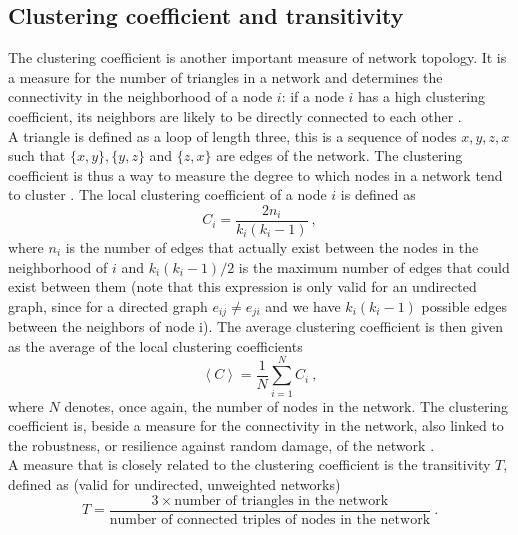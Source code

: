 \documentclass[11 pt , letterpaper , twoside , openright]{book}
\begin{document}
\subsection{Clustering coefficient and transitivity}

The clustering coefficient is another important measure of network topology. It is a measure for the number of triangles in a network and determines the connectivity in the neighborhood of a node $i$: if a node $i$ has a high clustering coefficient, its neighbors are likely to be directly connected to each other \cite{Li2017}. \\
\newline
A triangle is defined as a loop of length three, this is a sequence of nodes $x, y, z, x$ such that $\{x, y\}, \{y, z\}$ and $\{z, x\}$ are edges of the network. The clustering coefficient is thus a way to measure the degree to which nodes in a network tend to cluster \cite{Li2017}. The local clustering coefficient of a node $i$ is defined as \cite{Mata2020}
\begin{equation}\label{clus}
	C_i = \frac{2n_i}{k_i(k_i-1)} \ ,
\end{equation}
where $n_i$ is the number of edges that actually exist between the nodes in the neighborhood of $i$ and $k_i(k_i-1)/2$ is the maximum number of edges that could exist between them (note that this expression is only valid for an undirected graph, since for a directed graph $e_{ij} \neq e_{ji}$ and we have $k_i(k_i-1)$ possible edges between the neighbors of node i). %
The average clustering coefficient is then given as the average of the local clustering coefficients \cite{Newman2003}
\begin{equation}\label{avClus}
	\left<C\right> = \frac{1}{N}\sum_{i = 1}^N C_i \ ,
\end{equation}
where $N$ denotes, once again, the number of nodes in the network. The clustering coefficient is, beside a measure for the connectivity in the network, also linked to the robustness, or resilience against random damage,  of the network \cite{Heer2020}\cite{Iyer2013} \cite{Li2017}. \\
\newline
A measure that is closely related to the clustering coefficient is the transitivity $T$, defined as (valid for undirected, unweighted networks) \cite{F.Costa2007}\cite{Newman2003}
\begin{equation}\label{globalTrans}
	T = \frac{3 \times \text{number of triangles in the network}}{\text{number of connected triples of nodes in the network}} \ .
\end{equation}
\end{document}
